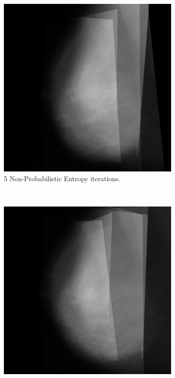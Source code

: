 \begin{figure}[H]
    \centering
    \begin{subfigure}[t]{0.3\textwidth}
        \includegraphics[width=\textwidth]{Appendix5/sample2/nonProb/5_scan.png}
        \caption{5 Non-Probabilistic Entropy iterations.}
        \label{fig:app-5-nonProb-sample2}
    \end{subfigure} \hfill
    ~ %
    \begin{subfigure}[t]{0.3\textwidth}
      \includegraphics[width=\textwidth]{Appendix5/sample2/nonProb/10_scan.png}

\end{subfigure}
\end{figure}
